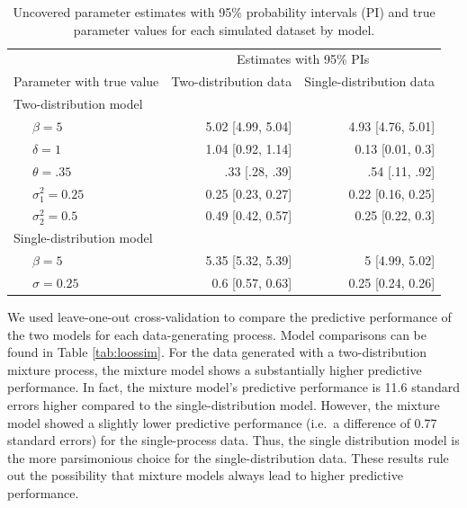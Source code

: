 \documentclass[
  man,floatsintext]{apa7}
\begin{document}
\begin{table}[tbp]

\begin{center}
\begin{threeparttable}

\caption{\label{tab:simparam}Uncovered parameter estimates with 95\% probability intervals (PI) and true parameter values for each simulated dataset by model.}

\begin{tabular}{lrr}
\toprule
 & \multicolumn{2}{c}{Estimates with 95\% PIs} \\
\cmidrule(r){2-3}
Parameter with true value & \multicolumn{1}{c}{Two-distribution data} & \multicolumn{1}{c}{Single-distribution data}\\
\midrule
Two-distribution model &  & \\
\ \ \ $\beta = 5$ & 5.02 [4.99, 5.04] & 4.93 [4.76, 5.01]\\
\ \ \ $\delta = 1$ & 1.04 [0.92, 1.14] & 0.13 [0.01, 0.3]\\
\ \ \ $\theta = .35$ & .33 [.28, .39] & .54 [.11, .92]\\
\ \ \ $\sigma^2_1 = 0.25$ & 0.25 [0.23, 0.27] & 0.22 [0.16, 0.25]\\
\ \ \ $\sigma^2_2 = 0.5$ & 0.49 [0.42, 0.57] & 0.25 [0.22, 0.3]\\
Single-distribution model &  & \\
\ \ \ $\beta = 5$ & 5.35 [5.32, 5.39] & 5 [4.99, 5.02]\\
\ \ \ $\sigma = 0.25$ & 0.6 [0.57, 0.63] & 0.25 [0.24, 0.26]\\
\bottomrule
\end{tabular}

\end{threeparttable}
\end{center}

\end{table}

We used leave-one-out cross-validation to compare the predictive performance of the two models for each data-generating process. Model comparisons can be found in Table \ref{tab:loossim}. For the data generated with a two-distribution mixture process, the mixture model shows a substantially higher predictive performance. In fact, the mixture model's predictive performance is 11.6 standard errors higher compared to the single-distribution model. However, the mixture model showed a slightly lower predictive performance (i.e.~a difference of 0.77 standard errors) for the single-process data. Thus, the single distribution model is the more parsimonious choice for the single-distribution data. These results rule out the possibility that mixture models always lead to higher predictive performance.
\end{document}
